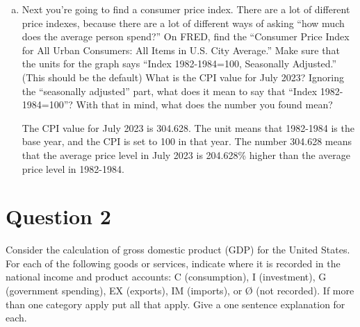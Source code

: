 \documentclass{article}
\newcommand{\question}[1]{\pagebreak\section{Question #1}}
\begin{document}
\begin{enumerate}[(a)]
    \item Next you’re going to find a consumer price index. There are a lot
    of different price indexes, because there are a lot of different ways
    of asking “how much does the average person spend?” On FRED,
    find the “Consumer Price Index for All Urban Consumers: All
    Items in U.S. City Average.” Make sure that the units for the
    graph says “Index 1982-1984=100, Seasonally Adjusted.” (This
    should be the default) What is the CPI value for July 2023?
    Ignoring the “seasonally adjusted” part, what does it mean to
    say that “Index 1982-1984=100”? With that in mind, what does
    the number you found mean?

    The CPI value for July 2023 is 304.628. The unit means that 1982-1984 is the base year, and the CPI is set to 100 in that year. The number 304.628 means that the average price level in July 2023 is 204.628\% higher than the average price level in 1982-1984.
\end{enumerate}

\pagebreak

\question{2}

Consider the calculation of gross domestic product (GDP) for the
United States. For each of the following goods or services, indicate
where it is recorded in the national income and product accounts:
C (consumption), I (investment), G (government spending), EX (exports), IM (imports), or Ø (not recorded). If more than one category
apply put all that apply. Give a one sentence explanation for each.
\end{document}
